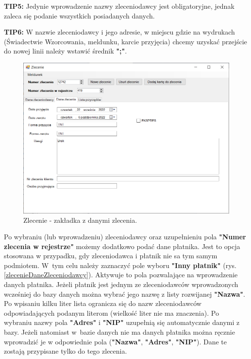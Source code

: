 \textbf{TIP5:} Jedynie wprowadzenie nazwy zleceniodawcy jest obligatoryjne, jednak zaleca się podanie wszystkich posiadanych danych.

\textbf{TIP6:} W nazwie zleceniodawcy i jego adresie, w miejscu gdzie na wydrukach (Świadectwie Wzorcowania, meldunku, karcie przyjęcia) chcemy uzyskać przejście do nowej linii należy wstawić średnik \textbf{";"}. 

\begin{figure}[htb]
	\centering
	\includegraphics[width=\columnwidth]{obrazki/Biuro/zlecenie/zlecenie_dane_zlecenia.png}
	\caption{Zlecenie - zakładka z danymi zlecenia.}
	\label{zlecenieDaneZlecenia}
\end{figure}

Po wybraniu (lub wprowadzeniu) zleceniodawcy oraz uzupełnieniu pola \textbf{"Numer zlecenia w rejestrze"} możemy dodatkowo podać dane płatnika. Jest to opcja stosowana w przypadku, gdy zleceniodawca i płatnik nie sa tym samym podmiotem. W~tym celu należy zaznaczyć pole wyboru \textbf{"Inny płatnik"} (rys. \ref{zlecenieDaneZleceniodawcy}). Aktywuje to pola pozwalające na wprowadzenie danych płatnika. Jeżeli płatnik jest jednym ze zleceniodawców wprowadzonych wcześniej do bazy danych można wybrać jego nazwę z listy rozwijanej \textbf{"Nazwa"}. Po wpisaniu kilku liter lista ogranicza się do nazw zleceniodawców odpowiadających podanym literom (wielkość liter nie ma znaczenia). Po wybraniu nazwy pola \textbf{"Adres"} i \textbf{"NIP"} uzupełnią się automatycznie danymi z bazy. Jeżeli natomiast w~bazie danych nie ma danych płatnika można ręcznie wprowadzić je w odpowiednie pola (\textbf{"Nazwa"}, \textbf{"Adres"}, \textbf{"NIP"}). Dane te zostają przypisane tylko do tego zlecenia.

